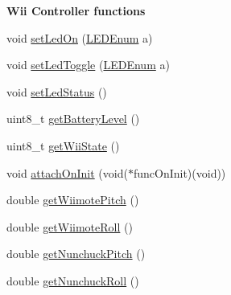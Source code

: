 \begin{Indent}{\bf \-Wii \-Controller functions}
\begin{DoxyCompactItemize}
\item 
void \hyperlink{class_w_i_i_a38507c76e5d7375a7971bc3a17b87338}{set\-Led\-On} (\hyperlink{controller_enums_8h_a70df64e026046bc352983127b7ae2cf0}{\-L\-E\-D\-Enum} a)
\item 
void \hyperlink{class_w_i_i_a8e81eb7d2d78680df0dee1869695ff05}{set\-Led\-Toggle} (\hyperlink{controller_enums_8h_a70df64e026046bc352983127b7ae2cf0}{\-L\-E\-D\-Enum} a)
\item 
void \hyperlink{class_w_i_i_a5d3b4a33ebc2ca9ebb154e10a05dbdd4}{set\-Led\-Status} ()
\item 
uint8\-\_\-t \hyperlink{class_w_i_i_ae946f7d6e9ce89fb083f5f138c0736c2}{get\-Battery\-Level} ()
\item 
uint8\-\_\-t \hyperlink{class_w_i_i_a8e9ac1d379db5c07c478401046a1c0ac}{get\-Wii\-State} ()
\item 
void \hyperlink{class_w_i_i_af384f13c59fee08a4be0c541e6a9b387}{attach\-On\-Init} (void($\ast$func\-On\-Init)(void))
\end{DoxyCompactItemize}
\end{Indent}
{\bf }\par
\begin{DoxyCompactItemize}
\item 
double \hyperlink{class_w_i_i_a2fb34f50b5374c9442af263f61595af4}{get\-Wiimote\-Pitch} ()
\item 
double \hyperlink{class_w_i_i_a9a58b857c84fa82152be7983efe70f60}{get\-Wiimote\-Roll} ()
\end{DoxyCompactItemize}

{\bf }\par
\begin{DoxyCompactItemize}
\item 
double \hyperlink{class_w_i_i_a052ed48b0eea76fbd3858024ce962c6f}{get\-Nunchuck\-Pitch} ()
\item 
double \hyperlink{class_w_i_i_a73e82829c5d13a4117ecd6d23b6c3d98}{get\-Nunchuck\-Roll} ()
\end{DoxyCompactItemize}

